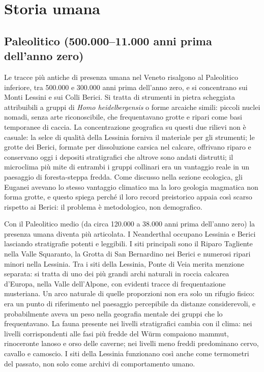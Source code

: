 \section{Storia umana}

\subsection{Paleolitico (500.000--11.000 anni prima dell'anno zero)}

Le tracce più antiche di presenza umana nel Veneto risalgono al Paleolitico inferiore, tra 500.000 e 300.000 anni prima dell'anno zero, e si concentrano sui Monti Lessini e sui Colli Berici. Si tratta di strumenti in pietra scheggiata attribuibili a gruppi di \textit{Homo heidelbergensis} o forme arcaiche simili: piccoli nuclei nomadi, senza arte riconoscibile, che frequentavano grotte e ripari come basi temporanee di caccia. La concentrazione geografica su questi due rilievi non è casuale: la selce di qualità della Lessinia forniva il materiale per gli strumenti; le grotte dei Berici, formate per dissoluzione carsica nel calcare, offrivano riparo e conservano oggi i depositi stratigrafici che altrove sono andati distrutti; il microclima più mite di entrambi i gruppi collinari era un vantaggio reale in un paesaggio di foresta-steppa fredda. Come discusso nella sezione ecologica, gli Euganei avevano lo stesso vantaggio climatico ma la loro geologia magmatica non forma grotte, e questo spiega perché il loro record preistorico appaia così scarso rispetto ai Berici: il problema è metodologico, non demografico.

Con il Paleolitico medio (da circa 120.000 a 38.000 anni prima dell'anno zero) la presenza umana diventa più articolata. I Neanderthal occupano Lessinia e Berici lasciando stratigrafie potenti e leggibili. I siti principali sono il Riparo Tagliente nella Valle Squaranto, la Grotta di San Bernardino nei Berici e numerosi ripari minori nella Lessinia. Tra i siti della Lessinia, Ponte di Veia merita menzione separata: si tratta di uno dei più grandi archi naturali in roccia calcarea d'Europa, nella Valle dell'Alpone, con evidenti tracce di frequentazione musteriana. Un arco naturale di quelle proporzioni non era solo un rifugio fisico: era un punto di riferimento nel paesaggio percepibile da distanze considerevoli, e probabilmente aveva un peso nella geografia mentale dei gruppi che lo frequentavano. La fauna presente nei livelli stratigrafici cambia con il clima: nei livelli corrispondenti alle fasi più fredde del Würm compaiono mammut, rinoceronte lanoso e orso delle caverne; nei livelli meno freddi predominano cervo, cavallo e camoscio. I siti della Lessinia funzionano così anche come termometri del passato, non solo come archivi di comportamento umano.


